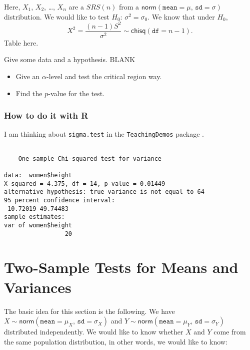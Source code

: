 \documentclass[]{book}
\newenvironment{Shaded}{\begin{snugshade}}{\end{snugshade}}
\newcommand{\KeywordTok}[1]{\textcolor[rgb]{0.13,0.29,0.53}{\textbf{{#1}}}}
\newcommand{\DataTypeTok}[1]{\textcolor[rgb]{0.13,0.29,0.53}{{#1}}}
\newcommand{\DecValTok}[1]{\textcolor[rgb]{0.00,0.00,0.81}{{#1}}}
\newcommand{\NormalTok}[1]{{#1}}
\providecommand{\tightlist}{%
  \setlength{\itemsep}{0pt}\setlength{\parskip}{0pt}}
\numberwithin{equation}{chapter}
\numberwithin{figure}{chapter}
\theoremstyle{plain}
\theoremstyle{definition}
\theoremstyle{remark}
\theoremstyle{definition}
\theoremstyle{definition}
\theoremstyle{remark}
\let\BeginKnitrBlock\begin \let\EndKnitrBlock\end
\begin{document}
Here, \(X_{1}\), \(X_{2}\), \ldots{}, \(X_{n}\) are a \(SRS(n)\) from a
\(\mathsf{norm}(\mathtt{mean} = \mu,\,\mathtt{sd} = \sigma)\)
distribution. We would like to test \(H_{0}:\,\sigma^{2} = \sigma_{0}\).
We know that under \(H_{0}\), \[ X^{2} = \frac{(n -
1)S^{2}}{\sigma^{2}} \sim \mathsf{chisq}(\mathtt{df} = n - 1).  \] Table
here.

\BeginKnitrBlock{example}
\protect\hypertarget{ex:unnamed-chunk-435}{}{\label{ex:unnamed-chunk-435}}Give
some data and a hypothesis. BLANK

\begin{itemize}
\tightlist
\item
  Give an \(\alpha\)-level and test the critical region way.
\item
  Find the \(p\)-value for the test.
\end{itemize}
\EndKnitrBlock{example}

\subsubsection{How to do it with R}\label{how-to-do-it-with-r-42}

I am thinking about \texttt{sigma.test}
 in the \texttt{TeachingDemos}
package \autocite{TeachingDemos}.

\begin{Shaded}
\end{Shaded}

\begin{verbatim}

    One sample Chi-squared test for variance

data:  women$height
X-squared = 4.375, df = 14, p-value = 0.01449
alternative hypothesis: true variance is not equal to 64
95 percent confidence interval:
 10.72019 49.74483
sample estimates:
var of women$height 
                 20 
\end{verbatim}

\section{Two-Sample Tests for Means and
Variances}\label{sec-two-sample-tests-for-means}

The basic idea for this section is the following. We have
\(X\sim\mathsf{norm}(\mathtt{mean} = \mu_{X},\,\mathtt{sd} = \sigma_{X})\)
and
\(Y\sim\mathsf{norm}(\mathtt{mean} = \mu_{Y},\,\mathtt{sd} = \sigma_{Y})\)
distributed independently. We would like to know whether \(X\) and \(Y\)
come from the same population distribution, in other words, we would
like to know:
\end{document}
